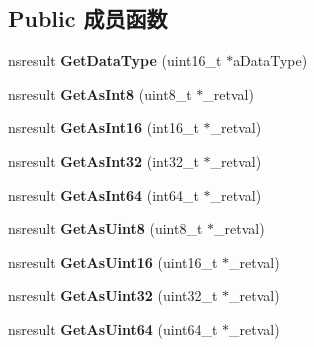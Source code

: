 \subsection*{Public 成员函数}
\begin{DoxyCompactItemize}
\item 
\mbox{\label{interfacens_i_variant_aa3da10620590c4acd0538b2fb73e0f96}} 
nsresult {\bfseries Get\+Data\+Type} (uint16\+\_\+t $\ast$a\+Data\+Type)
\item 
\mbox{\label{interfacens_i_variant_ab54df89632a641c0610163aed8f6d333}} 
nsresult {\bfseries Get\+As\+Int8} (uint8\+\_\+t $\ast$\+\_\+retval)
\item 
\mbox{\label{interfacens_i_variant_a8422a11cf31c3afc4cd8de8c73a72399}} 
nsresult {\bfseries Get\+As\+Int16} (int16\+\_\+t $\ast$\+\_\+retval)
\item 
\mbox{\label{interfacens_i_variant_a0eabd480c94cc98133d8c203a21bad99}} 
nsresult {\bfseries Get\+As\+Int32} (int32\+\_\+t $\ast$\+\_\+retval)
\item 
\mbox{\label{interfacens_i_variant_ad09fb645e8962e6d35d2edb2638c8633}} 
nsresult {\bfseries Get\+As\+Int64} (int64\+\_\+t $\ast$\+\_\+retval)
\item 
\mbox{\label{interfacens_i_variant_a8432a3661e7ce61c48a0298f88db7065}} 
nsresult {\bfseries Get\+As\+Uint8} (uint8\+\_\+t $\ast$\+\_\+retval)
\item 
\mbox{\label{interfacens_i_variant_a32b0eea8f1a5689c9d5951006e4b4702}} 
nsresult {\bfseries Get\+As\+Uint16} (uint16\+\_\+t $\ast$\+\_\+retval)
\item 
\mbox{\label{interfacens_i_variant_a4efe5eef4fb4808bd851999e87e443cc}} 
nsresult {\bfseries Get\+As\+Uint32} (uint32\+\_\+t $\ast$\+\_\+retval)
\item 
\mbox{\label{interfacens_i_variant_a9ad35dce876cda621e2ba9846a8dc7fd}} 
nsresult {\bfseries Get\+As\+Uint64} (uint64\+\_\+t $\ast$\+\_\+retval)
\item 

\end{DoxyCompactItemize}

